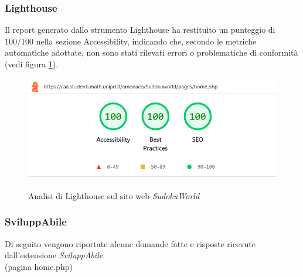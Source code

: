 \subsubsection{Lighthouse}
\noindent Il report generato dallo strumento Lighthouse ha restituito un punteggio di 100/100 nella sezione Accessibility, indicando che, secondo le metriche automatiche adottate, non sono stati rilevati errori o problematiche di conformità (vedi figura \ref{fig:Lighthouse_sudoku}).
\begin{figure}[H]
    \centering
    \includegraphics[width=0.6\linewidth, alt={Screenshot dell'analisi di Lighthouse sul sito web SudokuWorld}]{img/Lighthouse_sudoku.png}
    \caption{Analisi di Lighthouse sul sito web \textit{SudokuWorld}}\label{fig:Lighthouse_sudoku}
\end{figure}

\subsubsection{SviluppAbile}
\noindent Di seguito vengono riportate alcune domande fatte e risposte ricevute dall'estensione \textit{SviluppAbile}. \newline
\\ \vspace{-0.5cm}
\noindent(pagina home.php)\\
